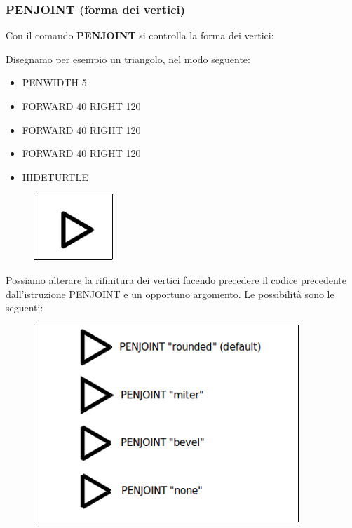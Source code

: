 \vskip 1cm

\subsubsection{PENJOINT (forma dei vertici)}

Con il comando \textbf{PENJOINT} si controlla la forma dei vertici:

Disegnamo per esempio un triangolo, nel modo seguente:

\vskip 1cm

\begin{scriptsize}
\begin{minipage}{0.40\textwidth}
\begin{itemize}[itemsep=-3pt,parsep=2pt]
\item[] PENWIDTH 5           
\item[] FORWARD 40 RIGHT 120
\item[] FORWARD 40 RIGHT 120
\item[] FORWARD 40 RIGHT 120
\item[] HIDETURTLE
\end{itemize}
\end{minipage}
\end{scriptsize}
\begin{minipage}{0.4\textwidth}
\begin{figure}[H]
   \includegraphics[width=3.0cm,trim=4 4 8 4,clip]{./images/disegnare/disegnare-34.png}
   \label{dis-34}
\end{figure}
\end{minipage} \hfill

\vskip 1cm

Possiamo alterare la rifinitura dei vertici facendo precedere il codice precedente dall'istruzione PENJOINT e un opportuno argomento. Le possibilità sono le seguenti:

\vskip 1cm

\begin{figure}[H]
   \centering
   \includegraphics[width=10.0cm,trim=8 8 8 8,clip]{./images/disegnare/disegnare-35.png}
   \label{dis-35}
\end{figure}

